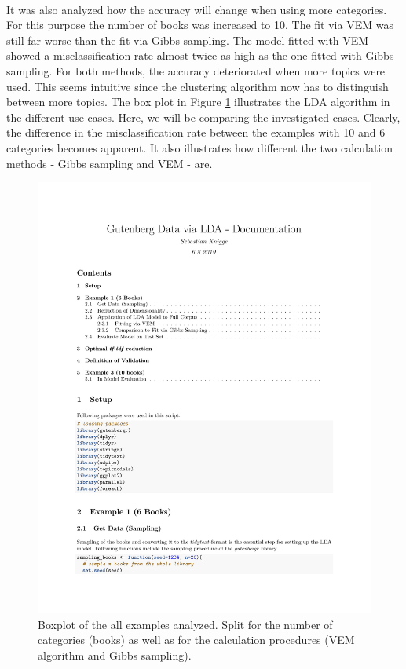 \documentclass[11pt,a4paper]{article}
\begin{document}
\ \\
It was also analyzed how the accuracy will change when using more categories. For this purpose the number of books was increased to 10. The fit via VEM was still far worse than the fit via Gibbs sampling. The model fitted with VEM showed a misclassification rate almost twice as high as the one fitted with Gibbs sampling. For both methods, the accuracy deteriorated when more topics were used. This seems intuitive since the clustering algorithm now has to distinguish between more topics. The box plot in Figure \ref{fig:comparison_boxplot} illustrates the LDA algorithm in the different use cases. Here, we will be comparing the investigated cases. Clearly, the difference in the misclassification rate between the examples with 10 and 6 categories becomes apparent. It also illustrates how different the two calculation methods - Gibbs sampling and VEM - are.
\begin{figure}[h]
	\centering
	\includegraphics[page=22, trim=70 400 0 0,clip,width=1.2\textwidth]{LDA_Documentation.pdf}
	\caption{Boxplot of the all examples analyzed. Split for the number of categories (books) as well as for the calculation procedures (VEM algorithm and Gibbs sampling).}
	\label{fig:comparison_boxplot}
\end{figure}
\end{document}
